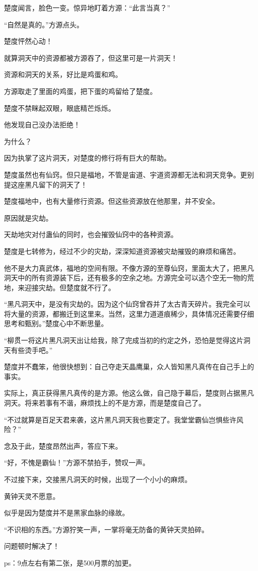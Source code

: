 \begin{this_body}
楚度闻言，脸色一变。惊异地盯着方源：“此言当真？”

“自然是真的。”方源点头。

楚度怦然心动！

就算洞天中的资源都被方源吞了，但这里可是一片洞天！

资源和洞天的关系，好比是鸡蛋和鸡。

方源取走了里面的鸡蛋，把下蛋的鸡留给了楚度。

楚度不禁眯起双眼，眼底精芒烁烁。

他发现自己没办法拒绝！

为什么？

因为执掌了这片洞天，对楚度的修行将有巨大的帮助。

楚度虽然也有仙窍。但只是福地，不管是宙道、宇道资源都无法和洞天竞争。更别提这座黑凡留下的洞天了！

楚度福地中，也有大量修行资源。但这些资源放在他那里，并不安全。

原因就是灾劫。

天劫地灾对付蛊仙的同时，也会摧毁仙窍中的各种资源。

楚度是七转修为，经过不少的灾劫，深深知道资源被灾劫摧毁的麻烦和痛苦。

他不是大力真武体，福地的空间有限。不像方源的至尊仙窍，里面太大了，把黑凡洞天中的所有资源装下后，还有极多的空余之地。方源完全可以选个空无一物的荒地，来迎接灾劫。但楚度就不行了。

“黑凡洞天中，是没有灾劫的。因为这个仙窍曾吞并了太古青天碎片。我完全可以将大量的资源，都搬迁到这里来。当然，这里力道道痕稀少，具体情况还需要仔细思考和甄别。”楚度心中不断思量。

“柳贯一将这片黑凡洞天出让给我，除了完成当初的约定之外，恐怕是觉得这片洞天有些烫手吧。”

楚度并不蠢笨，他很快想到：自己夺走天晶鹰巢，众人皆知黑凡真传在自己手上的事实。

实际上，真正获得黑凡真传的是方源。他这么做，自己隐于幕后，楚度则占据黑凡洞天。将来若事有不谐，麻烦找上的不是方源，而是楚度自己了。

“不过就算是百足天君来袭，这片黑凡洞天我也要定了。我堂堂霸仙岂惧些许风险？”

念及于此，楚度昂然出声，答应下来。

“好，不愧是霸仙！”方源不禁拍手，赞叹一声。

不过接下来，交接黑凡洞天的时候，出现了一个小小的麻烦。

黄钟天灵不愿意。

似乎是因为楚度并不是黑家血脉的缘故。

“不识相的东西。”方源狞笑一声，一掌将毫无防备的黄钟天灵拍碎。

问题顿时解决了！

ps：9点左右有第二张，是500月票的加更。

\end{this_body}

